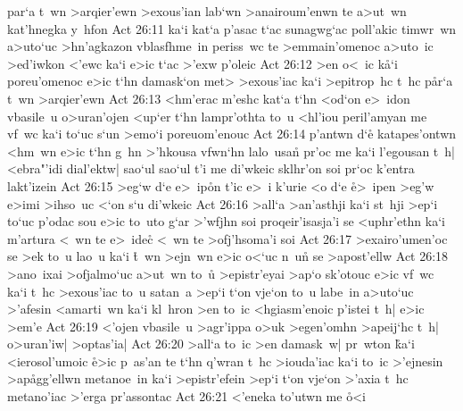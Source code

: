 par`a
t~wn
>arqier'ewn
>exous'ian
lab`wn
>anairoum'enwn
te
a>ut~wn
kat'hnegka
y~hfon\bibvsend
\vs Act 26:11
ka`i
kat`a
p'asac
t`ac
sunagwg`ac
poll'akic
timwr~wn
a>uto`uc
>hn'agkazon
vblasfhme~in
periss~wc
te
>emmain'omenoc
a>uto~ic
>ed'iwkon
<'ewc
ka`i
e>ic
t`ac
>'exw
p'oleic\bibvsend
\vs Act 26:12
>en
o<~ic
k\r{a}`i
poreu'omenoc
e>ic
t`hn
damask`on
met>
>exous'iac
ka`i
>epitrop~hc
t~hc
p\r{a}r`a
t~wn
>arqier'ewn\bibvsend
\vs Act 26:13
<hm'erac
m'eshc
kat`a
t`hn
<od`on
e>~idon
vbasile~u
o>uran'ojen
<up`er
t`hn
lampr'othta
to~u
<hl'iou
peril'amyan
me
vf~wc
ka`i
to`uc
s`un
>emo`i
poreuom'enouc\bibvsend
\vs Act 26:14
p'antwn
d`e\r{}
katapes'ontwn
<hm~wn
e>ic
t`hn
g~hn
>'hkousa
vfwn`hn
lalo~usan\r{}
pr'oc
me
ka`i
l'egousan
t~h|
<ebra"'idi
dial'ektw|
sao`ul
sao`ul
t'i
me
di'wkeic
sklhr'on
soi
pr`oc
k'entra
lakt'izein\bibvsend
\vs Act 26:15
>eg`w
d`e
e>~ip\r{o}n
t'ic
e>~i
k'urie
<o
d`e
\r{e}>~ipen
>eg'w
e>imi
>ihso~uc
<`on
s`u
di'wkeic\bibvsend
\vs Act 26:16
>all`a
>an'asthji
ka`i
st~hji
>ep`i
to`uc
p'odac
sou
e>ic
to~uto
g`ar
>'wfjhn
soi
proqeir'isasja'i
se
<uphr'ethn
ka`i
m'artura
<~wn
te
e>~ide\r{c}
<~wn
te
>ofj'hsoma'i
soi\bibvsend
\vs Act 26:17
>exairo'umen'oc
se
>ek
to~u
lao~u
ka`i
\r{t}~wn
>ejn~wn
e>ic
o<`uc
n~un\r{}
se
>apost'ellw\bibvsend
\vs Act 26:18
>ano~ixai
>ofjalmo`uc
a>ut~wn
to~u\r{}
>epistr'eyai
>ap`o
sk'otouc
e>ic
vf~wc
ka`i
t~hc
>exous'iac
to~u
satan~a
>ep`i
t`on
vje`on
to~u
labe~in
a>uto`uc
>'afesin
<amarti~wn
ka`i
kl~hron
>en
to~ic
<hgiasm'enoic
p'istei
t~h|
e>ic
>em'e\bibvsend
\vs Act 26:19
<'ojen
vbasile~u
>agr'ippa
o>uk
>egen'omhn
>apeij`hc
t~h|
o>uran'iw|
>optas'ia|\bibvsend
\vs Act 26:20
>all`a
to~ic
>en
damask~w|
pr~wton
\r{k}a`i
<ierosol'umoic
\r{e}>ic
p~as'an
te
t`hn
q'wran
t~hc
>iouda'iac
ka`i
to~ic
>'ejnesin
>ap\r{a}gg'ellwn
metanoe~in
ka`i
>epistr'efein
>ep`i
t`on
vje`on
>'axia
t~hc
metano'iac
>'erga
pr'assontac\bibvsend
\vs Act 26:21
<'eneka
to'utwn
me
\r{o}<i
